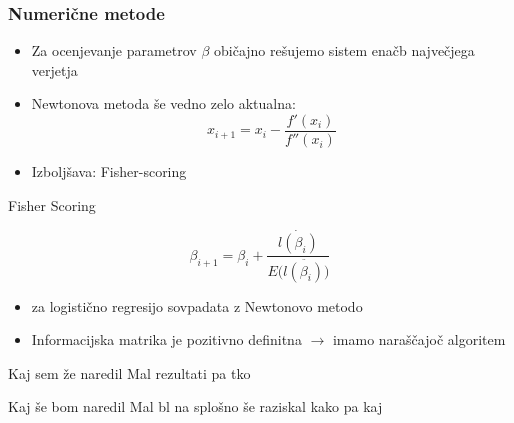 \documentclass[14pt]{beamer}
\begin{document}
\begin{frame}\frametitle{Numerične metode}
    \begin{itemize}
        \item Za ocenjevanje parametrov $\beta$ običajno rešujemo sistem enačb največjega verjetja
        \pause
        \item Newtonova metoda še vedno zelo aktualna:
        $$ x_{i+1} = x_{i} - \frac{f'(x_{i})}{f''(x_{i})} $$
        
        \item Izboljšava: Fisher-scoring  
    \end{itemize}
\end{frame}

\begin{frame}{Fisher Scoring}

    $$ \beta_{i+1} = \beta_{i} + \frac{\dot{l(\beta_{i})}}{E(\ddot{l(\beta_{i}))}} $$
    
    \begin{itemize}
        \item za logistično regresijo sovpadata z Newtonovo metodo
        \item Informacijska matrika je pozitivno definitna $\rightarrow$ imamo naraščajoč algoritem
    \end{itemize}

\end{frame}

\begin{frame}{Kaj sem že naredil}
    Mal rezultati pa tko
\end{frame}

\begin{frame}{Kaj še bom naredil}
    Mal bl na splošno še raziskal kako pa kaj
\end{frame}
\end{document}

